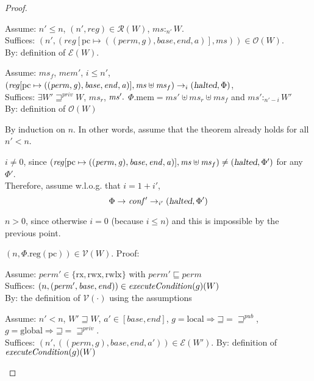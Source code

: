 \documentclass[a4paper]{article}
\newcommand{\update}[2]{[#1 \mapsto #2]}
\newcommand{\var}[1]{\mathit{#1}}
\newcommand{\hs}{\var{ms}}
\newcommand{\ms}{\hs}
\newcommand{\gl}{\var{g}}
\newcommand{\pcreg}{\mathrm{pc}}
\newcommand{\addr}{\var{a}}
\newcommand{\start}{\var{base}}
\newcommand{\addrend}{\var{end}}
\newcommand{\reg}{\var{reg}}
\newcommand{\heap}{\var{mem}}
\newcommand{\perm}{\var{perm}}
\newcommand{\plainproj}[1]{\mathrm{#1}}
\newcommand{\memheap}[1][\Phi]{#1.\plainproj{mem}}
\newcommand{\memreg}[1][\Phi]{#1.\plainproj{reg}}
\newcommand{\halted}{\textsl{halted}}
\newcommand{\plainfun}[2]{
  \ifthenelse{\equal{#2}{}}
  {\mathit{#1}}
  {\mathit{#1}(#2)}
}
\newcommand{\execCond}[1]{\plainfun{executeCondition}{#1}}
\newcommand{\future}{\mathbin{\sqsupseteq}}
\newcommand{\futurewk}{\mathbin{\sqsupseteq}^{\var{pub}}}
\newcommand{\futurestr}{\mathbin{\sqsupseteq}^{\var{priv}}}
\newcommand{\heapSat}[3][\heap]{#1 :_{#2} #3}
\newcommand{\asmType}{\plaindom{AsmType}}
\newcommand{\plaindom}[1]{\mathrm{#1}}
\newcommand{\intr}[2]{\mathcal{#1}}
\newcommand{\valueintr}[1]{\intr{V}{#1}}
\newcommand{\exprintr}[1]{\intr{E}{#1}}
\newcommand{\regintr}[1]{\intr{R}{#1}}
\newcommand{\stdvr}{\valueintr{\asmType}}
\newcommand{\stder}{\exprintr{\asmType}}
\newcommand{\stdrr}{\regintr{\asmType}}
\newcommand{\observations}{\mathcal{O}}
\newcommand{\npair}[2][n]{\left(#1,#2 \right)}
\newcommand{\plainperm}[1]{\mathrm{#1}}
\newcommand{\exec}{\plainperm{rx}}
\newcommand{\rwx}{\plainperm{rwx}}
\newcommand{\rwlx}{\plainperm{rwlx}}
\newcommand{\local}{\plainperm{local}}
\newcommand{\glob}{\plainperm{global}}
\newcommand{\step}[1][]{\rightarrow_{#1}}
\begin{document}
\begin{proof}
  \begin{enumproof}
  \item Assume: $n' \leq n$, $\npair[n']{\reg}\in \stdrr(W)$, $\heapSat[\hs]{n'}{W}$.\\
    Suffices: $\npair[n']{(\reg\update{\pcreg}{((\perm,\gl),\start,\addrend,\addr)},\hs)}\in\observations(W)$.\\
    By: definition of $\stder(W)$.
  \item Assume: $\ms_f$, $\heap'$, $i \leq n'$, $(\reg\update{\pcreg}{((\perm,\gl),\start,\addrend,\addr)},\hs \uplus \ms_f) \step[i] (\halted,\Phi)$,\\
    Suffices: $\exists W' \futurestr W$, $\hs_r$, $\hs' \ldotp$
    $\memheap[\Phi] = \hs' \uplus \hs_r \uplus \ms_f$ and $\heapSat[\hs']{n'-i}{W'}$\\
    By: definition of $\observations(W)$ \label{suff-after-eval}
  \item By induction on $n$. In other words, assume that the theorem already
    holds for all $n' < n$.
  \item $i \neq 0$, since
    $(\reg\update{\pcreg}{((\perm,\gl),\start,\addrend,\addr)},\hs \uplus
    \ms_f)\neq (\halted,\Phi')$ for any $\Phi'$. \\
    Therefore, assume w.l.o.g. that $i = 1+i'$,
    \begin{equation*}
      \Phi \step \var{conf'} \step[i'] (\halted,\Phi')
    \end{equation*}
  \item $n > 0$, since otherwise $i = 0$ (because $i \leq n$) and this is
    impossible by the previous point.
  \item $\npair{\memreg(\pcreg)}\in\stdvr(W)$. \label{step:ftlr-pc-vr}
    Proof:
    \begin{enumproof}
    \item Assume: $\perm' \in \{\exec,\rwx,\rwlx\}$ with $\perm'
      \sqsubseteq\perm$\\
      Suffices: $\npair{(\perm',\start,\addrend)}\in\execCond{g}(W)$\\
      By: the definition of $\stdvr(\cdot)$ using the assumptions
    \item Assume: $n'<n$, $W'\future W$, $\addr' \in [\start,\addrend]$, $\gl
      = \local \Rightarrow \future = \futurewk$,
      $\gl=\glob\Rightarrow\future = \futurestr$.\\
      Suffices: $\npair[n']{((\perm,\gl),\start,\addrend,\addr')} \in
      \stder(W')$.
      By: definition of $\execCond{g}(W)$

\end{enumproof}
\end{enumproof}
\end{proof}
\end{document}
